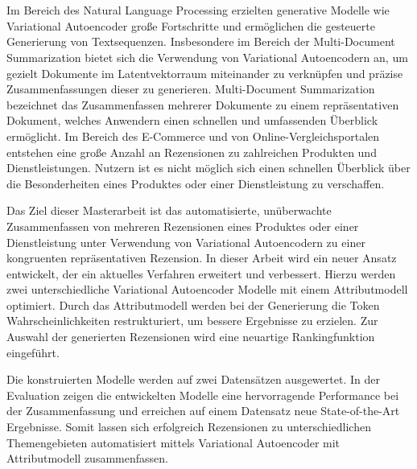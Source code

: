 \section*{}
Im Bereich des Natural Language Processing erzielten generative Modelle wie Variational Autoencoder große Fortschritte und ermöglichen die gesteuerte Generierung von Textsequenzen.
Insbesondere im Bereich der Multi-Document Summarization bietet sich die Verwendung von Variational Autoencodern an, um gezielt Dokumente im Latentvektorraum miteinander zu verknüpfen und präzise Zusammenfassungen dieser zu generieren.
Multi-Document Summarization bezeichnet das Zusammenfassen mehrerer Dokumente zu einem repräsentativen Dokument, welches Anwendern einen schnellen und umfassenden Überblick ermöglicht.
Im Bereich des E-Commerce und von Online-Vergleichsportalen entstehen eine große Anzahl an Rezensionen zu zahlreichen Produkten und Dienstleistungen.
Nutzern ist es nicht möglich sich einen schnellen Überblick über die Besonderheiten eines Produktes oder einer Dienstleistung zu verschaffen.

Das Ziel dieser Masterarbeit ist das automatisierte, unüberwachte Zusammenfassen von mehreren Rezensionen eines Produktes oder einer Dienstleistung unter Verwendung von Variational Autoencodern zu einer kongruenten repräsentativen Rezension.
In dieser Arbeit wird ein neuer Ansatz entwickelt, der ein aktuelles Verfahren erweitert und verbessert.
Hierzu werden zwei unterschiedliche Variational Autoencoder Modelle mit einem Attributmodell optimiert.
Durch das Attributmodell werden bei der Generierung die Token Wahrscheinlichkeiten restrukturiert, um bessere Ergebnisse zu erzielen.
Zur Auswahl der generierten Rezensionen wird eine neuartige Rankingfunktion eingeführt.

Die konstruierten Modelle werden auf zwei Datensätzen ausgewertet.
In der Evaluation zeigen die entwickelten Modelle eine hervorragende Performance bei der Zusammenfassung und erreichen auf einem Datensatz neue State-of-the-Art Ergebnisse.
Somit lassen sich erfolgreich Rezensionen zu unterschiedlichen Themengebieten automatisiert mittels Variational Autoencoder mit Attributmodell zusammenfassen.





